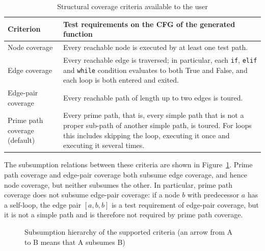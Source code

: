 \documentclass[11pt, a4paper]{article}
\begin{document}
\begin{table}[H]
    \centering
    \small
    \begin{tabularx}{\textwidth}{>{\raggedright\arraybackslash}p{3.2cm}X}
        \toprule
        \textbf{Criterion} & \textbf{Test requirements on the CFG of the generated function} \\
        \midrule
        Node coverage & Every reachable node is executed by at least one test path. \\
        Edge coverage & Every reachable edge is traversed; in particular, each \texttt{if}, \texttt{elif} and \texttt{while} condition evaluates to both True and False, and each loop is both entered and exited. \\
        Edge-pair coverage & Every reachable path of length up to two edges is toured. \\
        Prime path coverage (default) & Every prime path, that is, every simple path that is not a proper sub-path of another simple path, is toured. For loops this includes skipping the loop, executing it once and executing it several times. \\
        \bottomrule
    \end{tabularx}
    \caption{Structural coverage criteria available to the user}
\end{table}

The subsumption relations between these criteria are shown in Figure~\ref{fig:subsumption}. Prime path coverage and edge-pair coverage both subsume edge coverage, and hence node coverage, but neither subsumes the other. In particular, prime path coverage does not subsume edge-pair coverage: if a node $b$ with predecessor $a$ has a self-loop, the edge pair $[a, b, b]$ is a test requirement of edge-pair coverage, but it is not a simple path and is therefore not required by prime path coverage.

\begin{figure}[H]
    \centering
    \caption{Subsumption hierarchy of the supported criteria (an arrow from A to B means that A subsumes B)}
    \label{fig:subsumption}
\end{figure}
\end{document}

